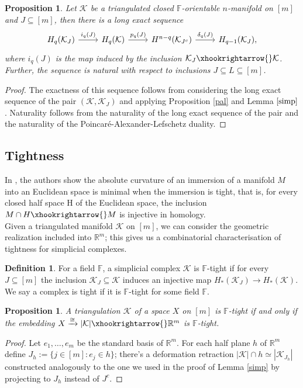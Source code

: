 \documentclass[a4paper]{amsart}
\newtheorem{prop}[thm]{Proposition}
\theoremstyle{definition}
\newtheorem{defin}[thm]{Definition}
\def\K{\mathcal{K}}
\def\R{\mathbb{R}}
\def\F{\mathbb{F}}
\begin{document}
\begin{prop}\label{les}
    Let $\K$ be a triangulated closed $\F$-orientable $n$-manifold on $[m]$ and $J\subseteq [m]$, then there is a long exact sequence
    \[\begin{tikzcd}
	{H_q(\K_J)} & {H_q(\K)} & {H^{n-q}(\K_{J^c})} & {H_{q-1}(\K_J),}
	\arrow["{i_q(J)}", from=1-1, to=1-2]
	\arrow["{p_q(J)}", from=1-2, to=1-3]
	\arrow["{\delta_q(J)}", from=1-3, to=1-4]
\end{tikzcd}\]
    where $i_q(J)$ is the map induced by the inclusion $\K_J\xhookrightarrow{}\K$. Further, the sequence is natural with respect to inclusions $J\subseteq L\subseteq [m]$.
\end{prop}
\begin{proof}
    The exactness of this sequence follows from considering the long exact sequence of the pair $(\K,\K_J)$ and applying Proposition \ref{pal} and Lemma $\ref{simp}$. Naturality follows from the naturality of the long exact sequence of the pair and the naturality of the Poincaré-Alexander-Lefschetz duality.
    \end{proof}

\subsection{Tightness} In \cite{KunLutz}, the authors show the absolute curvature of an immersion of a manifold $M$ into an Euclidean space is minimal when the immersion is tight, that is, for every closed half space H of the Euclidean space, the inclusion $M\cap H\xhookrightarrow{}M$ is injective in homology.\\

Given a triangulated manifold $\K$ on $[m]$, we can consider the geometric realization included into $\R^m$; this gives us a combinatorial characterisation of tightness for simplicial complexes.
\begin{defin}\label{tightdef}
    For a field $\F$, a simplicial complex $\K$ is $\F$-tight if for every $J\subseteq [m]$ the inclusion $\K_J\subseteq \K$ induces an injective map $H_*(\K_J)\to H_*(\K)$. We say a complex is tight if it is $\F$-tight for some field $\F$.
\end{defin}

\begin{prop}
    A triangulation $\K$ of a space $X$ on $[m]$ is $\F$-tight if and only if the embedding $X\xrightarrow{\cong}|\K|\xhookrightarrow{} \R^m$ is $\F$-tight.
\end{prop}
\begin{proof}
    Let $e_1,\ldots, e_m$ be the standard basis of $\R^m$. For each half plane $h$ of $\R^m$ define $J_h:=\{j\in [m]:e_j\in h\}$; there's a deformation retraction $|\K|\cap h\simeq |\K_{J_h}|$ constructed analogously to the one we used in the proof of Lemma \ref{simp} by projecting to $J_h$ instead of $J^c$.      
\end{proof}
\end{document}
